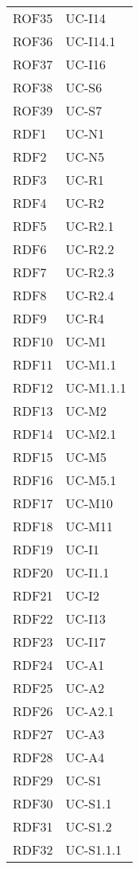 \begin{longtable}{| p{5cm} | p{5cm} |}
		\rowcolor{LightGray}
		ROF35 & UC-I14\\
		ROF36 & UC-I14.1\\
		\rowcolor{LightGray}
		ROF37 & UC-I16\\
		ROF38 & UC-S6\\
		\rowcolor{LightGray}
		ROF39 & UC-S7\\		
		RDF1 & UC-N1\\
		\rowcolor{LightGray}
		RDF2 & UC-N5\\
		RDF3 & UC-R1 \\
		\rowcolor{LightGray}
		RDF4 & UC-R2\\
		RDF5 & UC-R2.1\\
		\rowcolor{LightGray}
		RDF6 & UC-R2.2\\
		RDF7 & UC-R2.3\\
		\rowcolor{LightGray}
		RDF8 & UC-R2.4\\
		RDF9 & UC-R4\\
		\rowcolor{LightGray}
		RDF10 & UC-M1\\
		RDF11 & UC-M1.1 \\
		\rowcolor{LightGray}
		RDF12 & UC-M1.1.1 \\
		RDF13 & UC-M2 \\
		\rowcolor{LightGray}
		RDF14 & UC-M2.1 \\
		RDF15 & UC-M5 \\
		\rowcolor{LightGray}
		RDF16 & UC-M5.1 \\
		RDF17 & UC-M10\\
		\rowcolor{LightGray}
		RDF18 & UC-M11\\
		RDF19 & UC-I1\\
		\rowcolor{LightGray}
		RDF20 & UC-I1.1\\
		RDF21 & UC-I2 \\
		\rowcolor{LightGray}
		RDF22 & UC-I13 \\
		RDF23 & UC-I17\\
		\rowcolor{LightGray}
		RDF24 & UC-A1\\
		RDF25 & UC-A2\\
		\rowcolor{LightGray}
		RDF26 & UC-A2.1\\
		RDF27 & UC-A3\\
		\rowcolor{LightGray}
		RDF28 & UC-A4\\
		RDF29 & UC-S1\\
		\rowcolor{LightGray}
		RDF30 & UC-S1.1\\
		RDF31 & UC-S1.2\\
		\rowcolor{LightGray}
		RDF32 & UC-S1.1.1\\

\end{longtable}
